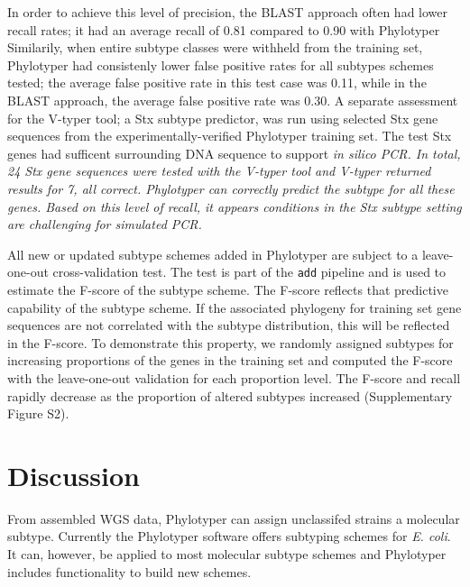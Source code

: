 \documentclass{bioinfo}
\begin{document}
In order to achieve this level of precision, the BLAST approach often had lower recall rates; it had an average recall of 0.81 compared to 0.90 with Phylotyper
Similarily, when entire subtype classes were withheld from the training set, Phylotyper had consistenly lower false positive rates for all subtypes schemes tested; the average false positive rate in this test case was 0.11, while in the BLAST approach, the average false positive rate was 0.30.
A separate assessment for the V-typer tool; a Stx subtype predictor, was run using selected Stx gene sequences from the experimentally-verified Phylotyper training set.
The test Stx genes had sufficent surrounding DNA sequence to support \it{in silico} PCR.
In total, 24 Stx gene sequences were tested with the V-typer tool and V-typer returned results for 7, all correct.
Phylotyper can correctly predict the subtype for all these genes.
Based on this level of recall, it appears conditions in the Stx subtype setting are challenging for simulated PCR.

All new or updated subtype schemes added in Phylotyper are subject to a leave-one-out cross-validation test.
The test is part of the \texttt{add} pipeline and is used to estimate the F-score of the subtype scheme. 
The F-score reflects that predictive capability of the subtype scheme. 
If the associated phylogeny for training set gene sequences are not correlated with the subtype distribution, this will be reflected in the F-score. 
To demonstrate this property, we randomly assigned subtypes for increasing proportions of the genes in the training set and computed the F-score with the leave-one-out validation for each proportion level.
The F-score and recall rapidly decrease as the proportion of altered subtypes increased (Supplementary Figure S2).

\section{Discussion}

From assembled WGS data, Phylotyper can assign unclassifed strains a molecular subtype.
Currently the Phylotyper software offers subtyping schemes for \textit{E. coli}.
It can, however, be applied to most molecular subtype schemes and Phylotyper includes functionality to build new schemes.
\end{document}
